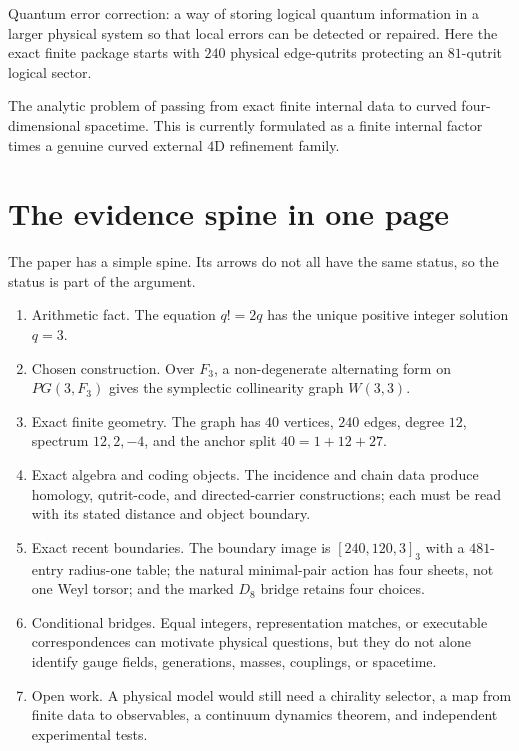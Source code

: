 \documentclass[11pt]{article}
\def\mathbb#1{#1}%
\def\mathrm#1{#1}%
\def\textbf#1{#1}%
\begin{document}
\begin{statusbox}[title=Vocabulary before the journey]
\begin{description}[leftmargin=2.6em,style=nextline]
\item[QEC.]
Quantum error correction: a way of storing logical quantum information in a larger physical system so that local errors can be detected or repaired. Here the exact finite package starts with $240$ physical edge-qutrits protecting an $81$-qutrit logical sector.

\item[Continuum bridge.]
The analytic problem of passing from exact finite internal data to curved four-dimensional spacetime. This is currently formulated as a finite internal factor times a genuine curved external $4$D refinement family.
\end{description}
\end{statusbox}

\section*{The evidence spine in one page}

The paper has a simple spine.  Its arrows do not all have the same status, so the status is part of the argument.

\begin{enumerate}[leftmargin=2em]
\item \textbf{Arithmetic fact.} The equation $q! = 2q$ has the unique positive integer solution $q=3$.
\item \textbf{Chosen construction.} Over $\mathbb{F}_3$, a non-degenerate alternating form on $\mathrm{PG}(3,\mathbb{F}_3)$ gives the symplectic collinearity graph $W(3,3)$.
\item \textbf{Exact finite geometry.} The graph has $40$ vertices, $240$ edges, degree $12$, spectrum $12,2,-4$, and the anchor split $40=1+12+27$.
\item \textbf{Exact algebra and coding objects.} The incidence and chain data produce homology, qutrit-code, and directed-carrier constructions; each must be read with its stated distance and object boundary.
\item \textbf{Exact recent boundaries.} The boundary image is $[240,120,3]_3$ with a $481$-entry radius-one table; the natural minimal-pair action has four sheets, not one Weyl torsor; and the marked $D_8$ bridge retains four choices.
\item \textbf{Conditional bridges.} Equal integers, representation matches, or executable correspondences can motivate physical questions, but they do not alone identify gauge fields, generations, masses, couplings, or spacetime.
\item \textbf{Open work.} A physical model would still need a chirality selector, a map from finite data to observables, a continuum dynamics theorem, and independent experimental tests.
\end{enumerate}
\end{document}
